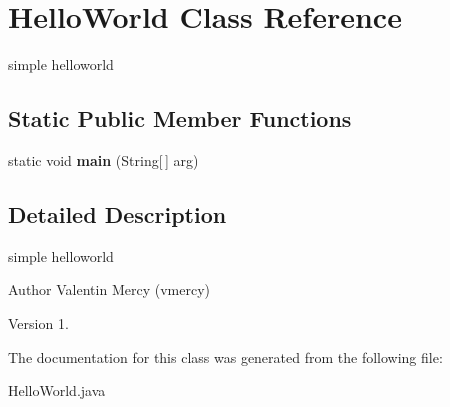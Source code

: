 \hypertarget{class_hello_world}{}\section{Hello\+World Class Reference}
\label{class_hello_world}


simple helloworld  


\subsection*{Static Public Member Functions}
\begin{DoxyCompactItemize}
\item 
\mbox{\label{class_hello_world_acaf4da2077d316d0f2c4c4eed557bde9}} 
static void {\bfseries main} (String\mbox{[}$\,$\mbox{]} arg)
\end{DoxyCompactItemize}


\subsection{Detailed Description}
simple helloworld 

\begin{DoxyAuthor}{Author}
Valentin Mercy (vmercy) 
\end{DoxyAuthor}
\begin{DoxyVersion}{Version}
1. 
\end{DoxyVersion}


The documentation for this class was generated from the following file\+:\begin{DoxyCompactItemize}
\item 
Hello\+World.\+java\end{DoxyCompactItemize}
